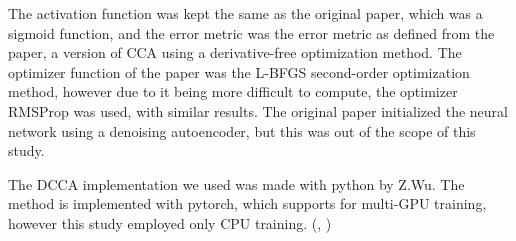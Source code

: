 {The activation function was kept the same as the original paper, which was a sigmoid function, and the error metric was the error metric as defined from the paper, a version of CCA using a derivative-free optimization method. The optimizer function of the paper was the L-BFGS second-order optimization method, however due to it being more difficult to compute, the optimizer RMSProp was used, with similar results. The original paper initialized the neural network using a denoising autoencoder, but this was out of the scope of this study.  \cite{76}

The DCCA implementation we used was made with python by Z.Wu. The method is implemented with pytorch, which supports for multi-GPU training, however this study employed only CPU training.  (\cite{77}, \cite{78})
}